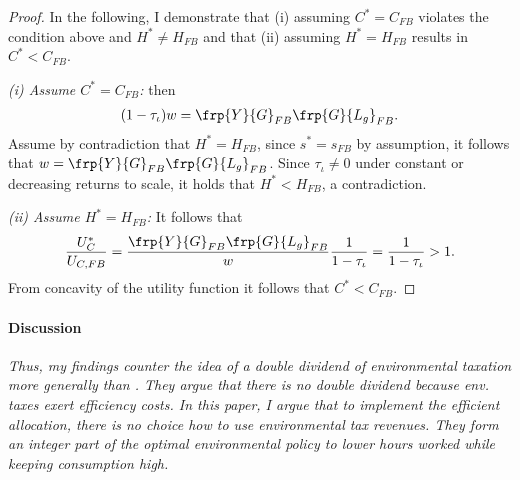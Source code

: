 \begin{proof}
In the following, I demonstrate that (i) assuming $C^*=C_{FB}$ violates the condition above and $H^*\neq H_{FB}$ and that (ii) assuming $H^*=H_{FB}$ results in $C^*<C_{FB}$. 

\textit{(i) Assume $C^*=C_{FB}$:}
then
\begin{align}
(1-\tau_\iota)w=\frp{Y}{G}_{FB}\frp{G}{L_g}_{FB}.
\end{align}
Assume by contradiction that $H^*=H_{FB}$, since $s^*=s_{FB}$ by assumption, it follows that $w=\frp{Y}{G}_{FB}\frp{G}{L_g}_{FB}$. 
Since $\tau_\iota\neq 0$ under constant or decreasing returns to scale, it holds that $H^*<H_{FB}$, a contradiction. 


%

\textit{(ii) Assume $H^*=H_{FB}$:} 
It follows that 
\begin{align}
\frac{U_C^*}{U_{C,FB}}=\frac{\frp{Y}{G}_{FB}\frp{G}{L_g}_{FB}}{w}\frac{1}{1-\tau_\iota}=\frac{1}{1-\tau_\iota}>1.
\end{align}
From concavity of the utility function it follows that $C^*<C_{FB}$. 
 \end{proof}


 

\paragraph{Discussion}
\textit{Thus, my findings counter the idea of a double dividend of environmental taxation more generally than \cite{LansBovenberg1994EnvironmentalTaxation}. They argue that there is no double dividend because env. taxes exert efficiency costs. In this paper, I argue that to implement the efficient allocation, there is no choice how to use environmental tax revenues. They form an integer part of the optimal environmental policy to lower hours worked while keeping consumption high.}

